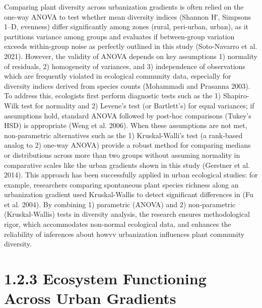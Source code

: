Comparing plant diversity across urbanization gradients is often relied on the one-way ANOVA to test whether mean diversity indices (Shannon H′, Simpson\textquotesingle s 1--D, evenness) differ significantly among zones (rural, peri-urban, urban), as it partitions variance among groups and evaluates if between-group variation exceeds within-group noise as perfectly outlined in this study (Soto-Navarro et al. 2021). However, the validity of ANOVA depends on key assumptions 1) normality of residuals, 2) homogeneity of variances, and 3) independence of observations which are frequently violated in ecological community data, especially for diversity indices derived from species counts (Mohammadi and Prasanna 2003). To address this, ecologists first perform diagnostic tests such as the 1) Shapiro-Wilk test for normality and 2) Levene's test (or Bartlett's) for equal variances; if assumptions hold, standard ANOVA followed by post-hoc comparisons (Tukey's HSD) is appropriate (Weng et al. 2006). When these assumptions are not met, non-parametric alternatives such as the 1) Kruskal-Walli's test (a rank-based analog to 2) one-way ANOVA) provide a robust method for comparing medians or distributions across more than two groups without assuming normality in comparative scales like the urban gradients shown in this study (Gerstner et al. 2014). This approach has been successfully applied in urban ecological studies: for example, researchers comparing spontaneous plant species richness along an urbanization gradient used Kruskal-Wallis to detect significant differences in (Fu et al. 2004). By combining 1) parametric (ANOVA) and 2) non-parametric (Kruskal-Wallis) tests in diversity analysis, the research ensures methodological rigor, which accommodates non-normal ecological data, and enhances the reliability of inferences about howvv urbanization influences plant community diversity.
\hypertarget{ecosystem-functioning-across-urban-gradients}{%
\section{\texorpdfstring{\textbf{1.2.3 Ecosystem Functioning Across Urban Gradients}}{1.2.3 Ecosystem Functioning Across Urban Gradients}}\label{ecosystem-functioning-across-urban-gradients}}

